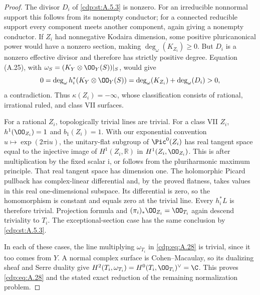 \begin{proof}
The divisor $D_i$ of \ref{cdp:st:A.5.3} is nonzero. For an irreducible nonnormal support this follows from its nonempty conductor; for a connected reducible support every component meets another component, again giving a nonempty conductor. If $Z_i$ had nonnegative Kodaira dimension, some positive pluricanonical power would have a nonzero section, making $\deg_\omega(K_{Z_i})\ge0$. But $D_i$ is a nonzero effective divisor and therefore has strictly positive degree. Equation (A.25), with $\omega_S=(K_Y\otimes\OO_Y(S))|_S$, would give
\[
 0=\deg_\omega h_i^*(K_Y\otimes\OO_Y(S))
   =\deg_\omega(K_{Z_i})+\deg_\omega(D_i)>0,
\]
a contradiction. Thus $\kappa(Z_i)=-\infty$, whose classification consists of rational, irrational ruled, and class VII surfaces.

For a rational $Z_i$, topologically trivial lines are trivial. For a class VII $Z_i$, $h^1(\OO_{Z_i})=1$ and $b_1(Z_i)=1$. With our exponential convention $u\mapsto\exp(2\pi\mathrm i u)$, the unitary-flat subgroup of $\Pic^0(Z_i)$ has real tangent space equal to the injective image of $H^1(Z_i,\mathbb R)$ in $H^1(Z_i,\OO_{Z_i})$. This is \cite[Lemma~2.3(2)]{Teleman2006} after multiplication by the fixed scalar $\mathrm i$, or follows from the pluriharmonic maximum principle. That real tangent space has dimension one. The holomorphic Picard pullback has complex-linear differential and, by the proved flatness, takes values in this real one-dimensional subspace. Its differential is zero, so the homomorphism is constant and equals zero at the trivial line. Every $h_i^*L$ is therefore trivial. Projection formula and $(\pi_i)_*\OO_{Z_i}=\OO_{T_i}$ again descend triviality to $T_i$. The exceptional-section case has the same conclusion by \ref{cdp:st:A.5.3}.

In each of these cases, the line multiplying $\omega_{T_i}$ in \eqref{cdp:eq:A.28} is trivial, since it too comes from $Y$. A normal complex surface is Cohen--Macaulay, so its dualizing sheaf and Serre duality give $H^2(T_i,\omega_{T_i})=H^0(T_i,\OO_{T_i})^\vee=\C$. This proves \eqref{cdp:eq:A.28} and the stated exact reduction of the remaining normalization problem.
\end{proof}


